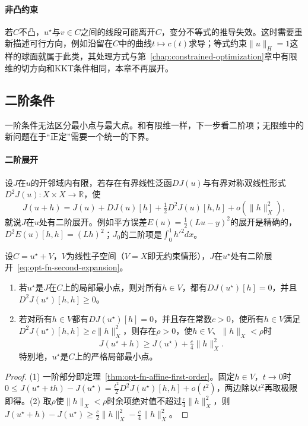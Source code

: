 \paragraph{非凸约束}
若$C$不凸，$u^\star$与$v\in C$之间的线段可能离开$C$，变分不等式的推导失效。这时需要重新描述可行方向，例如沿留在$C$中的曲线$t\mapsto c(t)$求导；等式约束$\|u\|_H=1$这样的球面就属于此类，其处理方式与第~\ref{chap:constrained-optimization}章中有限维的切方向和KKT条件相同，本章不再展开。

\subsection{二阶条件}
\label{sec:opt-fn-second-order}

一阶条件无法区分最小点与最大点。和有限维一样，下一步看二阶项；无限维中的新问题在于“正定”需要一个统一的下界。

\paragraph{二阶展开}
设$J$在$u$的开邻域内有限，若存在有界线性泛函$DJ(u)$与有界对称双线性形式$D^2J(u):X\times X\to\mathbb R$，使
\begin{equation}
 J(u+h)=J(u)+DJ(u)[h]+\tfrac12D^2J(u)[h,h]+o(\|h\|_X^2) ,
 \label{eq:opt-fn-second-expansion}
\end{equation}
就说$J$在$u$处有二阶展开。例如平方误差$E(u)=\frac12(Lu-y)^2$的展开是精确的，$D^2E(u)[h,h]=(Lh)^2$；$J_0$的二阶项是$\int_0^1h'^2dx$。

\begin{theorem}[二阶条件]
\label{thm:opt-fn-second-order}
设$C=u^\star+V$，$V$为线性子空间（$V=X$即无约束情形），$J$在$u^\star$处有二阶展开~\eqref{eq:opt-fn-second-expansion}。
\begin{enumerate}
 \item 若$u^\star$是$J$在$C$上的局部最小点，则对所有$h\in V$，都有$DJ(u^\star)[h]=0$，并且$D^2J(u^\star)[h,h]\ge0$。
 \item 若对所有$h\in V$都有$DJ(u^\star)[h]=0$，并且存在常数$c>0$，使所有$h\in V$满足$D^2J(u^\star)[h,h]\ge c\|h\|_X^2$，则存在$\rho>0$，使$h\in V$、$\|h\|_X<\rho$时
 \[
  J(u^\star+h)\ge J(u^\star)+\tfrac c4\|h\|_X^2 .
 \]
 特别地，$u^\star$是$C$上的严格局部最小点。
\end{enumerate}
\end{theorem}

\begin{proof}
(1) 一阶部分即定理~\ref{thm:opt-fn-affine-first-order}。固定$h\in V$，$t\to0$时$0\le J(u^\star+th)-J(u^\star)=\frac{t^2}2D^2J(u^\star)[h,h]+o(t^2)$，两边除以$t^2$再取极限即得。(2) 取$\rho$使$\|h\|_X<\rho$时余项绝对值不超过$\frac c4\|h\|_X^2$，则$J(u^\star+h)-J(u^\star)\ge\frac c2\|h\|_X^2-\frac c4\|h\|_X^2$。
\end{proof}

